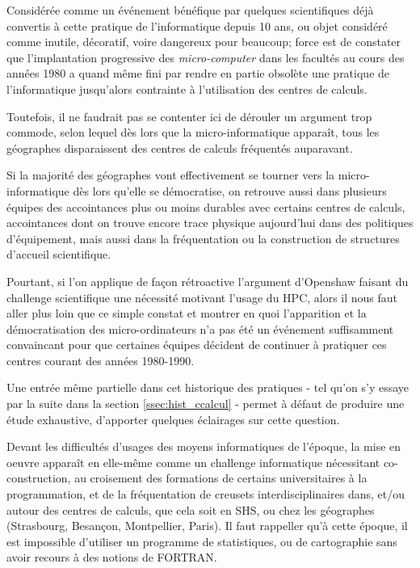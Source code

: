 Considérée comme un événement bénéfique par quelques scientifiques déjà convertis à cette pratique de l'informatique depuis 10 ans, ou objet considéré comme inutile, décoratif, voire dangereux pour beaucoup; force est de constater que l'implantation progressive des \textit{micro-computer} dans les facultés au cours des années 1980 a quand même fini par rendre en partie obsolète une pratique de l’informatique jusqu'alors contrainte à l'utilisation des centres de calculs.

Toutefois, il ne faudrait pas se contenter ici de dérouler un argument trop commode, selon lequel dès lors que la micro-informatique apparaît, tous les géographes disparaissent des centres de calculs fréquentés auparavant.

Si la majorité des géographes vont effectivement se tourner vers la micro-informatique dès lors qu'elle se démocratise, on retrouve aussi dans plusieurs équipes des accointances plus ou moins durables avec certains centres de calculs, accointances dont on trouve encore trace physique aujourd'hui dans des politiques d'équipement, mais aussi dans la fréquentation ou la construction de structures d'accueil scientifique.

Pourtant, si l'on applique de façon rétroactive l'argument d'Openshaw faisant du challenge scientifique une nécessité motivant l'usage du HPC, alors il nous faut aller plus loin que ce simple constat et montrer en quoi l'apparition et la démocratisation des micro-ordinateurs n'a pas été un événement suffisamment convaincant pour que certaines équipes décident de continuer à pratiquer ces centres courant des années 1980-1990.

Une entrée même partielle dans cet historique des pratiques - tel qu'on s'y essaye par la suite dans la section \ref{ssec:hist_ccalcul} - permet à défaut de produire une étude exhaustive, d'apporter quelques éclairages sur cette question.

Devant les difficultés d'usages des moyens informatiques de l'époque, la mise en oeuvre apparaît en elle-même comme un challenge informatique nécessitant co-construction, au croisement des formations de certains universitaires à la programmation, et de la fréquentation de creusets interdisciplinaires dans, et/ou autour des centres de calculs, que cela soit en SHS, ou chez les géographes (Strasbourg, Besançon, Montpellier, Paris). Il faut rappeller qu'à cette époque, il est impossible d'utiliser un programme de statistiques, ou de cartographie sans avoir recours à des notions de FORTRAN.


